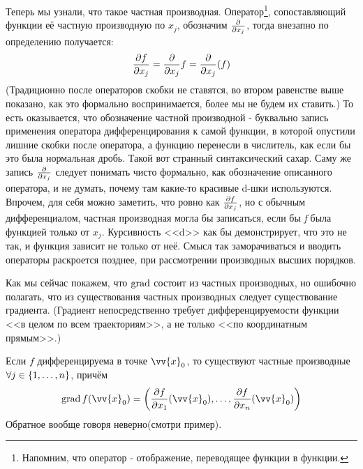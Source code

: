 \begin{anote}
	 Теперь мы узнали, что такое частная производная. Оператор\footnote{Напомним, что оператор - отображение, переводящее функции в функции.}, сопоставляющий функции её частную производную по $x_j$, обозначим $\frac{\partial }{\partial x_j}$, тогда внезапно по определению получается:
	\[
		\frac{\partial f}{\partial x_j}=\frac{\partial }{\partial x_j}f=\frac{\partial }{\partial x_j}(f)
	\]
	(Традиционно после операторов скобки не ставятся, во втором равенстве выше показано, как это формально воспринимается, более мы не будем их ставить.)
	 То есть оказывается, что обозначение частной производной - буквально запись применения оператора дифференцирования к самой функции, в которой опустили лишние скобки после оператора, а функцию перенесли в числитель, как если бы это была нормальная дробь. Такой вот странный синтаксический сахар. Саму же запись 	$\frac{\partial }{\partial x_j}$  следует понимать чисто формально, как обозначение описанного оператора, и не думать, почему там какие-то красивые d-шки используются. Впрочем, для себя можно заметить, что ровно как $\frac{\partial f}{\partial x_j}$, но с обычным дифференциалом, частная производная могла бы записаться, если бы \textit{f} была функцией только от $x_j$. Курсивность <<d>> как бы демонстрирует, что это не так, и функция зависит не только от неё. Смысл так заморачиваться и вводить операторы раскроется позднее, при рассмотрении производных высших порядков.
\end{anote}

\begin{note}
	Как мы сейчас покажем, что $\operatorname{grad}$ состоит из частных производных, но ошибочно полагать, что из существования частных производных следует существование градиента. (Градиент непосредственно требует дифференцируемости функции <<в целом по всем траекториям>>, а не только <<по координатным прямым>>.) 
\end{note}

\begin{theorem}
	Если $f$ дифференцируема в точке $\vv{x}_0$, то существуют частные производные $\forall j \in \{1, \ldots, n\}$, причём
	\[
		\grad f(\vv{x}_0) = \left(\frac{\vdelta f}{\vdelta x_1}(\vv{x}_0), \ldots, \frac{\vdelta f}{\vdelta x_n}(\vv{x}_0)\right)
	\]
	Обратное вообще говоря неверно(смотри пример).
\end{theorem}

